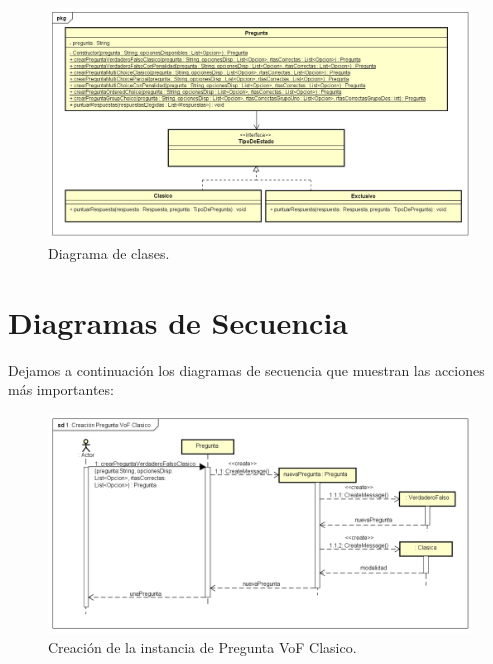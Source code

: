 \documentclass[titlepage,a4paper]{article}
\begin{document}
\begin{figure}[H]
\centering
\includegraphics[width=1\textwidth]{img/UMLClases4.png}
\caption{\label{fig:class01}Diagrama de clases.}
\end{figure}

\newpage
\section{Diagramas de Secuencia}

Dejamos a continuación los diagramas de secuencia que muestran las acciones más importantes:

\begin{figure}[H]
\centering
\includegraphics[width=1\textwidth]{img/UMLSeq2.png}
\caption{\label{fig:class01}Creación de la instancia de Pregunta VoF Clasico.}
\end{figure}
\end{document}
